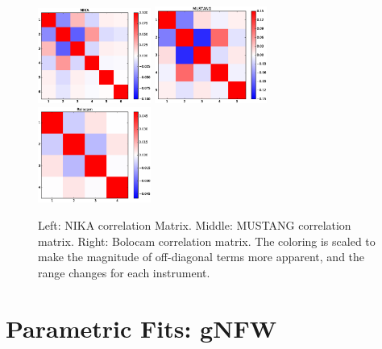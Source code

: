 \documentclass[twocolumn,traditabstract]{aa}
\begin{document}
\begin{figure}[h]
  \centering
  \includegraphics[width=0.33\textwidth]{NIKA_ml_deproj_figs/Real_Joint_gNFW_Real_11011111_2500S_500B_100W_NIKA_correlation_matrix_clim_bwr.eps}
  \includegraphics[width=0.33\textwidth]{NIKA_ml_deproj_figs/Real_Joint_gNFW_Real_11011111_2500S_500B_100W_MUSTANG_correlation_matrix_clim_bwr.eps}
  \includegraphics[width=0.33\textwidth]{NIKA_ml_deproj_figs/Real_Joint_gNFW_Real_11011111_2500S_500B_100W_Bolocam_correlation_matrix_clim_bwr.eps}
  \caption{Left: NIKA correlation Matrix. Middle: MUSTANG correlation matrix. Right: Bolocam correlation matrix. The coloring is
    scaled to make the magnitude of off-diagonal terms more apparent, and the range changes for each instrument.}
  \label{fig:corr_matrices}
\end{figure}




\section{Parametric Fits: gNFW}
\label{sec:parfits}
\end{document}
